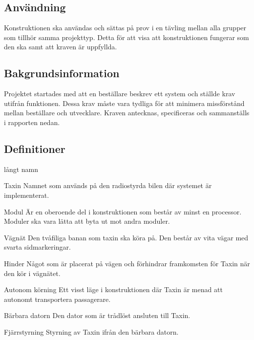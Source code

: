 \documentclass[kravspec/krav.tex]{subfiles}
\begin{document}
\subsection{Användning}
Konstruktionen ska användas och sättas på prov i en tävling mellan alla grupper
som tillhör samma projekttyp. Detta för att visa att konstruktionen fungerar
som den ska samt att kraven är uppfyllda.

\subsection{Bakgrundsinformation}
Projektet startades med att en beställare beskrev ett system och ställde krav
utifrån funktionen. Dessa krav måste vara tydliga för att minimera missförstånd
mellan beställare och utvecklare. Kraven antecknas, specificeras och
sammanställs i rapporten nedan.

\subsection{Definitioner}
\begin{labeling}{långt namn}
    \item[Taxin] Namnet som används på den radiostyrda bilen där systemet är
    implementerat.
    \item[Modul] Är en oberoende del i konstruktionen som består av minst en
    processor. Moduler ska vara lätta att byta ut mot andra moduler.
    \item[Vägnät] Den tvåfiliga banan som taxin ska köra på. Den består av vita
    vägar med svarta sidmarkeringar.
    \item[Hinder] Något som är placerat på vägen och förhindrar framkomsten för
    Taxin när den kör i vägnätet.
    \item[Autonom körning] Ett visst läge i konstruktionen där Taxin är menad
    att autonomt transportera passagerare.
    \item[Bärbara datorn] Den dator som är trådlöst ansluten till Taxin.
    \item[Fjärrstyrning] Styrning av Taxin ifrån den bärbara datorn. 
\end{labeling}
\end{document}
